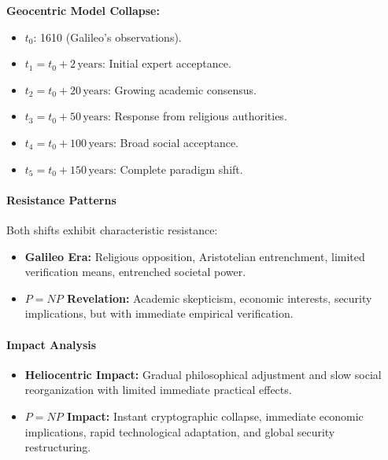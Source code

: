 \documentclass[11pt]{article}
\begin{document}
\textbf{Geocentric Model Collapse:}
\begin{itemize}
    \item $t_0$: 1610 (Galileo's observations).
    \item $t_1=t_0+2\,\text{years}$: Initial expert acceptance.
    \item $t_2=t_0+20\,\text{years}$: Growing academic consensus.
    \item $t_3=t_0+50\,\text{years}$: Response from religious authorities.
    \item $t_4=t_0+100\,\text{years}$: Broad social acceptance.
    \item $t_5=t_0+150\,\text{years}$: Complete paradigm shift.
\end{itemize}

\paragraph{Resistance Patterns}

Both shifts exhibit characteristic resistance:
\begin{itemize}
    \item \textbf{Galileo Era:} Religious opposition, Aristotelian entrenchment, limited verification means, entrenched societal power.
    \item \textbf{$P=NP$ Revelation:} Academic skepticism, economic interests, security implications, but with immediate empirical verification.
\end{itemize}

\paragraph{Impact Analysis}

\begin{itemize}
    \item \textbf{Heliocentric Impact:} Gradual philosophical adjustment and slow social reorganization with limited immediate practical effects.
    \item \textbf{$P=NP$ Impact:} Instant cryptographic collapse, immediate economic implications, rapid technological adaptation, and global security restructuring.
\end{itemize}
\end{document}
